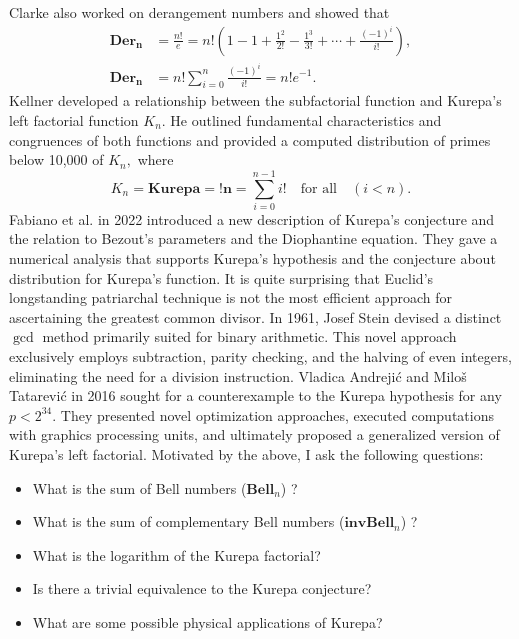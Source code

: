 \documentclass[pdflatex,sn-mathphys-num]{sn-jnl}%
\theoremstyle{thmstyleone}%
\theoremstyle{thmstyletwo}%
\theoremstyle{thmstylethree}%
\begin{document}
Clarke \cite{clarke1993derangements} also worked on derangement numbers and showed that
\begin{align*}
\mathbf{Der_n}&= \frac{n!}{e}= n! \left( 1-1 + \frac{1^2}{2!} - \frac{1^3}{3!} + \cdots +\frac{(-1)^i}{i!} \right),\\
\mathbf{Der_n}&= n!\sum_{i=0}^n\frac{(-1)^i}{i!} = n!e^{-1}.
\end{align*}
Kellner \cite{kellner2004some} developed a relationship between the subfactorial function and Kurepa's left factorial function $K_n$. He outlined fundamental characteristics and congruences of both functions and provided a computed distribution of primes below 10,000 of $K_n,$ where
\begin{equation}
   K_n=\mathbf{Kurepa} = \mathbf{!n}=\sum_{i=0}^{n-1}i!   \quad \mbox{for all} \quad (i<n).
\end{equation}
Fabiano et al. \cite{unknown} in 2022 introduced a new description of  Kurepa’s conjecture and the relation to Bezout’s parameters and the Diophantine equation. They gave a numerical analysis that supports Kurepa’s hypothesis and the conjecture about distribution for Kurepa’s function.
It is quite surprising that Euclid's longstanding patriarchal technique is not the most efficient approach for ascertaining the greatest common divisor. In 1961, Josef Stein \cite{stein1967computational} devised a distinct $\gcd$ method primarily suited for binary arithmetic. This novel approach exclusively employs subtraction, parity checking, and the halving of even integers, eliminating the need for a division instruction.
Vladica Andrejić and Miloš Tatarević in 2016 \cite{andrejic2016searching} sought for a counterexample to the Kurepa hypothesis for any $p < 2^{34}$. They presented novel optimization approaches, executed computations with graphics processing units, and ultimately proposed a generalized version of Kurepa’s left factorial. 
Motivated by the above, I ask the following questions:
\begin{itemize}\label{Solve}
\item[(i)] What is the sum of Bell numbers ($\mathbf{Bell}_n$) ?
\item[(ii)] What is the sum of complementary Bell numbers ($\mathbf{invBell}_n$) ?
\item[(iii)] What is the logarithm of the Kurepa factorial?
\item[(iv)] Is there a trivial equivalence to the Kurepa conjecture?
\item[(v)] What are some possible physical applications of Kurepa?
\end{itemize}
\end{document}
